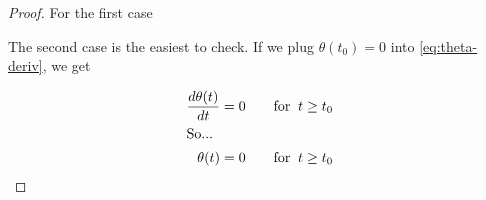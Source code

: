 \begin{proof}

For the first case 

The second case is the easiest to check. If we plug $\theta(t_0) = 0$ into \ref{eq:theta-deriv}, we get

\begin{align*}
\frac{d\theta(t)}{dt} = 0 \qquad \text{for} \;\; t \ge t_0\\
\intertext{So...}
\theta(t) = 0 \qquad \text{for} \;\; t \ge t_0
\end{align*}

\end{proof}